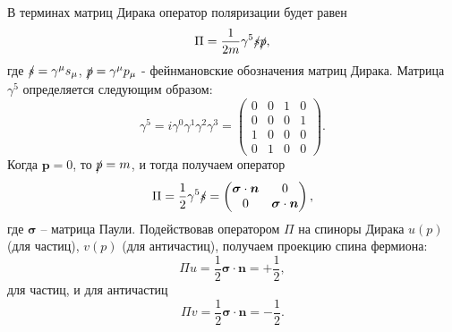 \documentclass{extreport}
\begin{document}
В терминах матриц Дирака оператор поляризации будет равен
\begin{equation}
	\Pi = \frac{1}{2m} \gamma^5 \slashed{s} \slashed{p}, 
\end{equation}
где $\slashed{s} = \gamma^\mu s_\mu$, $\slashed{p} = \gamma^\mu p_\mu$ - фейнмановские обозначения матриц Дирака. Матрица $\gamma^5$ определяется следующим образом:
\begin{equation}
	\gamma^5 = i \gamma^0 \gamma^1 \gamma^2 \gamma^3 = \begin{pmatrix}
		0 &  0 & 1 & 0 \\
		0 & 0 & 0 & 1 \\
		1 & 0 & 0 & 0 \\
		0 & 1 & 0 & 0
	\end{pmatrix}.
\end{equation}
Когда $\textbf{p}=0$, то $\slashed{p} = m$, и тогда получаем оператор
\begin{equation}
	\Pi = \frac{1}{2} \gamma^5 \slashed{s} = \begin{pmatrix}
		\boldsymbol{\sigma} \cdot \boldsymbol{n} & 0 \\ 0 & \boldsymbol{\sigma} \cdot \boldsymbol{n}
	\end{pmatrix},
\end{equation}
где $\boldsymbol{\sigma}$ -- матрица Паули. Подействовав оператором $\Pi$ на спиноры Дирака $u(p)$ (для частиц), $v(p)$ (для античастиц), получаем проекцию спина фермиона:
\begin{equation}
	\Pi u = \frac{1}{2} \boldsymbol{\sigma} \cdot \boldsymbol{n} = + \frac{1}{2}, 
\end{equation}
для частиц, и для античастиц
\begin{equation}
	\Pi v = \frac{1}{2} \boldsymbol{\sigma} \cdot \boldsymbol{n} = - \frac{1}{2}.
\end{equation}
\end{document}

